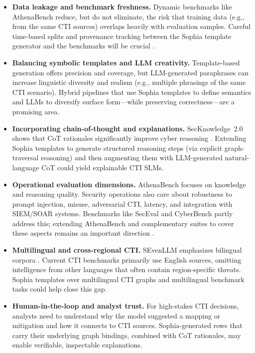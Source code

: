 \documentclass[webpdf,contemporary,large]{oup-authoring-template}
\theoremstyle{thmstyleone}
\theoremstyle{thmstyletwo}
\theoremstyle{thmstylethree}
\begin{document}
\begin{itemize}
  \item \textbf{Data leakage and benchmark freshness.} Dynamic benchmarks like AthenaBench reduce, but do not eliminate, the risk that training data (e.g., from the same CTI sources) overlaps heavily with evaluation samples. Careful time-based splits and provenance tracking between the Sophia template generator and the benchmarks will be crucial \cite{alam2025athenabench,cardei2025ift}.
  \item \textbf{Balancing symbolic templates and LLM creativity.} Template-based generation offers precision and coverage, but LLM-generated paraphrases can increase linguistic diversity and realism (e.g., multiple phrasings of the same CTI scenario). Hybrid pipelines that use Sophia templates to define semantics and LLMs to diversify surface form---while preserving correctness---are a promising area.
  \item \textbf{Incorporating chain-of-thought and explanations.} SecKnowledge~2.0 shows that CoT rationales significantly improve cyber reasoning \cite{levi2025toward}. Extending Sophia templates to generate structured reasoning steps (via explicit graph-traversal reasoning) and then augmenting them with LLM-generated natural-language CoT could yield explainable CTI SLMs.
  \item \textbf{Operational evaluation dimensions.} AthenaBench focuses on knowledge and reasoning quality. Security operations also care about robustness to prompt injection, misuse, adversarial CTI, latency, and integration with SIEM/SOAR systems. Benchmarks like SecEval and CyberBench partly address this; extending AthenaBench and complementary suites to cover these aspects remains an important direction \cite{hu2024seceval,liu2024cyberbench,alam2025athenabench}.
  \item \textbf{Multilingual and cross-regional CTI.} SEvenLLM emphasizes bilingual corpora \cite{ji2024sevenllm}. Current CTI benchmarks primarily use English sources, omitting intelligence from other languages that often contain region-specific threats. Sophia templates over multilingual CTI graphs and multilingual benchmark tasks could help close this gap.
  \item \textbf{Human-in-the-loop and analyst trust.} For high-stakes CTI decisions, analysts need to understand why the model suggested a mapping or mitigation and how it connects to CTI sources. Sophia-generated rows that carry their underlying graph bindings, combined with CoT rationales, may enable verifiable, inspectable explanations.
\end{itemize}
\end{document}
